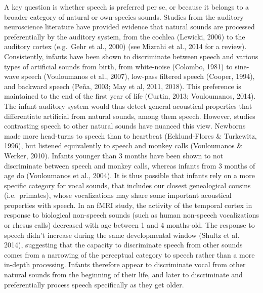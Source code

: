 \documentclass[man]{apa6}
\begin{document}
A key question is whether speech is preferred per se, or because it
belongs to a broader category of natural or own-species sounds. Studies
from the auditory neuroscience literature have provided evidence that
natural sounds are processed preferentially by the auditory system, from
the cochlea (Lewicki, 2006) to the auditory cortex (e.g.~Gehr et al.,
2000) (see Mizrahi et al., 2014 for a review). Consistently, infants
have been shown to discriminate between speech and various types of
artificial sounds from birth, from white-noise (Colombo, 1981) to
sine-wave speech (Vouloumanos et al., 2007), low-pass filtered speech
(Cooper, 1994), and backward speech (Peña, 2003; May et al, 2011, 2018).
This preference is maintained to the end of the first year of life
(Curtin, 2013; Vouloumanos, 2014). The infant auditory system would thus
detect general acoustical properties that differentiate artificial from
natural sounds, among them speech. However, studies contrasting speech
to other natural sounds have nuanced this view. Newborns made more
head-turns to speech than to heartbeat (Ecklund-Flores \& Turkewitz,
1996), but listened equivalently to speech and monkey calls (Vouloumanos
\& Werker, 2010). Infants younger than 3 months have been shown to not
discriminate between speech and monkey calls, whereas infants from 3
months of age do (Vouloumanos et al., 2004). It is thus possible that
infants rely on a more specific category for vocal sounds, that includes
our closest genealogical cousins (i.e.~primates), whose vocalizations
may share some important acoustical properties with speech. In an fMRI
study, the activity of the temporal cortex in response to biological
non-speech sounds (such as human non-speech vocalizations or rhesus
calls) decreased with age between 1 and 4 months-old. The response to
speech didn't increase during the same developmental window (Shultz et
al. 2014), suggesting that the capacity to discriminate speech from
other sounds comes from a narrowing of the perceptual category to speech
rather than a more in-depth processing. Infants therefore appear to
discriminate vocal from other natural sounds from the beginning of their
life, and later to discriminate and preferentially process speech
specifically as they get older.
\end{document}
